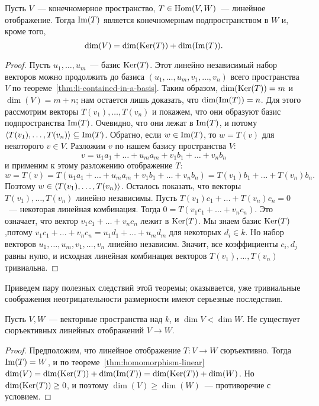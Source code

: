 \begin{theorem}[О гомоморфизме]\label{thm:homomorphism-linear}
Пусть $V$~--- конечномерное пространство, $T\in\operatorname{Hom}(V,W)$~---
линейное отображение. Тогда $\operatorname{Im}(T)$ является конечномерным
подпространством в $W$ и, кроме того,
$$
\dim(V) = \dim(\operatorname{Ker}(T)) + \dim(\operatorname{Im}(T)).
$$
\end{theorem}
\begin{proof}
Пусть $u_1,\dots,u_m$~--- базис $\operatorname{Ker}(T)$. Этот линейно
независимый набор векторов можно продолжить до базиса
$(u_1,\dots,u_m,v_1,\dots,v_n)$ всего пространства $V$
по теореме~\ref{thm:li-contained-in-a-basis}.
Таким образом, $\dim(\operatorname{Ker}(T)) = m$ и $\dim(V) = m+n$;
нам остается лишь доказать, что $\dim(\operatorname{Im}(T)) = n$.
Для этого рассмотрим векторы $T(v_1),\dots,T(v_n)$ и покажем,
что они образуют базис подпространства $\operatorname{Im}(T)$. Очевидно,
что они лежат в $\operatorname{Im}(T)$, и потому
$\langle T(v_1),\dots,T(v_n)\rangle\subseteq\operatorname{Im}(T)$. Обратно, если
$w\in\operatorname{Im}(T)$, то $w=T(v)$ для некоторого $v\in V$.
Разложим $v$ по нашем базису пространства $V$:
$$
v = u_1a_1+\dots+u_ma_m + v_1b_1+\dots+v_nb_n
$$
и применим к этому разложению отображение $T$:
$$
w = T(v) = T(u_1a_1+\dots+u_ma_m + v_1b_1 + \dots + v_nb_n)
= T(v_1)b_1 + \dots + T(v_n)b_n.
$$
Поэтому $w\in \langle T(v_1),\dots,T(v_n)\rangle$.
Осталось показать, что векторы $T(v_1),\dots,T(v_n)$
линейно независимы. Пусть
$T(v_1)c_1 + \dots + T(v_n)c_n = 0$~--- некоторая линейная комбинация.
Тогда $0=T(v_1c_1+\dots+v_nc_n)$. Это означает, что
вектор $v_1c_1+\dots+v_nc_n$ лежит в $\operatorname{Ker}(T)$.
Мы знаем базис $\operatorname{Ker}(T)$,потому
$v_1c_1+\dots+v_nc_n = u_1d_1 + \dots +u_md_m$ для некоторых
$d_i\in k$. Но набор векторов $u_1,\dots,u_m,v_1,\dots,v_n$
лниейно независим. Значит, все коэффициенты $c_i,d_j$ равны
нулю, и исходная линейная комбинация векторов
$T(v_1),\dots,T(v_n)$ тривиальна.
\end{proof}

Приведем пару полезных следствий этой теоремы; оказывается,
уже тривиальные соображения неотрицательности размерности
имеют серьезные последствия.

\begin{corollary}
Пусть $V,W$~--- векторные пространства над $k$, и
$\dim V < \dim W$. Не существует сюръективных линейных
отображений $V\to W$.
\end{corollary}
\begin{proof}
Предположим, что линейное отображение
$T\colon V\to W$ сюръективно. Тогда
$\operatorname{Im}(T) = W$, и по теореме~\ref{thm:homomorphism-linear}
$\dim(V) = \dim(\operatorname{Ker}(T)) + \dim(\operatorname{Im}(T))
= \dim(\operatorname{Ker}(T)) + \dim(W)$.
Но $\dim(\operatorname{Ker}(T))\geq 0$, и поэтому
$\dim(V) \geq \dim(W)$~--- противоречие с условием.
\end{proof}

